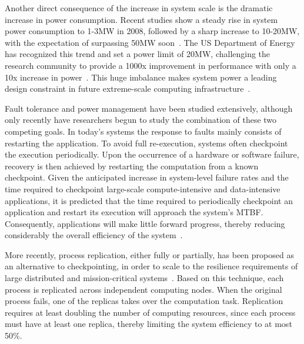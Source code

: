 Another direct consequence of the increase in system scale is the dramatic increase in power consumption. Recent studies show a steady rise in system power consumption to 1-3MW in 2008, followed by a sharp increase to 10-20MW, with the expectation of surpassing 50MW soon~\cite{doe_ascr_exascale_2011}. The US Department of Energy has recognized this trend and set a power limit of 20MW, challenging the research community to provide a 1000x improvement in performance with only a 10x increase in power~\cite{doe_ascr_exascale_2011}. %
This huge imbalance makes system power a leading design constraint in future extreme-scale computing infrastructure~\cite{Sarood2014,Villa2014}.


Fault tolerance and power management have been studied extensively, although only recently have researchers begun to study the combination of these two competing goals. In today's systems the response to faults mainly consists of restarting the application. To avoid full re-execution, systems often checkpoint the execution periodically. Upon the occurrence of a hardware or software failure, recovery is then achieved by restarting the computation from a known checkpoint. Given the anticipated increase in system-level failure rates and the time required to checkpoint large-scale compute-intensive and data-intensive applications, it is predicted that the time required to periodically checkpoint an application and restart its execution will approach the system's MTBF. Consequently, applications will make little forward progress, thereby reducing considerably the overall efficiency of the system~\cite{ferreira_sc_2011}.%

More recently, process replication, either fully or partially, has been proposed as an alternative to checkpointing, in order to scale to the resilience requirements of large distributed and mission-critical systems~\cite{fiala_2012_sdc}. Based on this technique, each process is replicated across independent computing
nodes. When the original process fails, one of the replicas takes over the computation task. Replication 
requires at least doubling the number of computing resources, since each process must have at least one replica, thereby 
limiting the system efficiency to at most 50\%.

